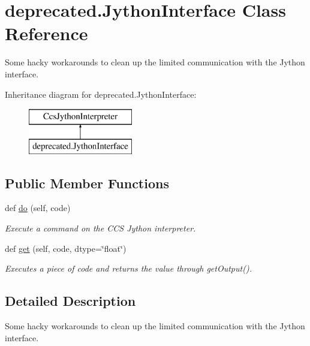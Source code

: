 \hypertarget{classdeprecated_1_1_jython_interface}{}\section{deprecated.\+Jython\+Interface Class Reference}
\label{classdeprecated_1_1_jython_interface}


Some hacky workarounds to clean up the limited communication with the Jython interface.  


Inheritance diagram for deprecated.\+Jython\+Interface\+:\begin{figure}[H]
\begin{center}
\leavevmode
\includegraphics[height=2.000000cm]{classdeprecated_1_1_jython_interface}
\end{center}
\end{figure}
\subsection*{Public Member Functions}
\begin{DoxyCompactItemize}
\item 
def \hyperlink{classdeprecated_1_1_jython_interface_a0cd1c2bab5f66d4d34069a330b1a1303}{do} (self, code)
\begin{DoxyCompactList}\small\item\em Execute a command on the C\+CS Jython interpreter. \end{DoxyCompactList}\item 
def \hyperlink{classdeprecated_1_1_jython_interface_addcd57aa8723240416239dd13ba5940e}{get} (self, code, dtype=\char`\"{}float\char`\"{})
\begin{DoxyCompactList}\small\item\em Executes a piece of code and returns the value through get\+Output(). \end{DoxyCompactList}\end{DoxyCompactItemize}


\subsection{Detailed Description}
Some hacky workarounds to clean up the limited communication with the Jython interface. 



